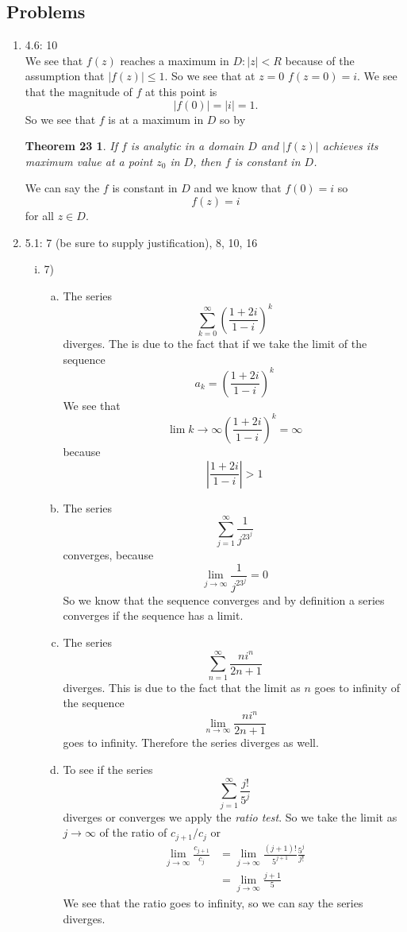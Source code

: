 \documentclass[11pt]{article}
\begin{document}
\subsection*{Problems}
\begin{enumerate}
\item 4.6: 10 \\
We see that $f(z)$ reaches a maximum in $D: |z|<R$ because of the assumption that $|f(z)|\le 1$. So we see that at $z=0$ $f(z=0) = i$. We see that the magnitude of $f$ at this point is
$$|f(0)| = |i| = 1.$$
So we see that $f$ is at a maximum in $D$ so by 
\newtheorem{Theo23}{Theorem 23}
\begin{Theo23}
If $f$ is analytic in a domain $D$ and $|f(z)|$ achieves its maximum value at a point $z_0$ in $D$, then $f$ is constant in $D$.
\end{Theo23}
We can say the $f$ is constant in $D$ and we know that $f(0)=i$ so $$f(z) = i$$ for all $z\in D$.

\item 5.1: 7 (be sure to supply justification), 8, 10, 16  
\begin{enumerate}[(i)]
\item 7)
\begin{enumerate}[(a)]
\item 
The series 
$$\sum_{k=0}^{\infty}\left(\frac{1+2i}{1-i}\right)^k$$
diverges. The is due to the fact that if we take the limit of the sequence 
$$a_k = \left(\frac{1+2i}{1-i}\right)^k$$
We see that 
$$\lim{k\rightarrow\infty}\left(\frac{1+2i}{1-i}\right)^k= \infty$$
because 
$$\left|\frac{1+2i}{1-i}\right| > 1$$

\item
The series 
$$\sum_{j=1}^{\infty}\frac{1}{j^23^j}$$
converges, because 
$$\lim_{j\rightarrow\infty}\frac{1}{j^23^j}=0$$
So we know that the sequence converges and by definition a series converges if the sequence has a limit.

\item
The series 
$$\sum_{n=1}^{\infty}\frac{ni^n}{2n+1}$$
diverges. This is due to the fact that the limit as $n$ goes to infinity of the sequence 
$$\lim_{n\rightarrow\infty}\frac{ni^n}{2n+1}$$
goes to infinity. Therefore the series diverges as well.

\item To see if the series
$$\sum_{j=1}^{\infty}\frac{j!}{5^j}$$
diverges or converges we apply the \emph{ratio test}. So we take the limit as $j\rightarrow\infty$ of the ratio of $c_{j+1}/c_j$ or
\begin{align*}
\lim_{j\rightarrow\infty} \frac{c_{j+1}}{c_j} &=  \lim_{j\rightarrow\infty} \frac{(j+1)!}{5^{j+1}}\frac{5^j}{j!}\\
&= \lim_{j\rightarrow\infty} \frac{j+1}{5}
\end{align*}
We see that the ratio goes to infinity, so we can say the series diverges.


\end{enumerate}
\end{enumerate}
\end{enumerate}
\end{document}
